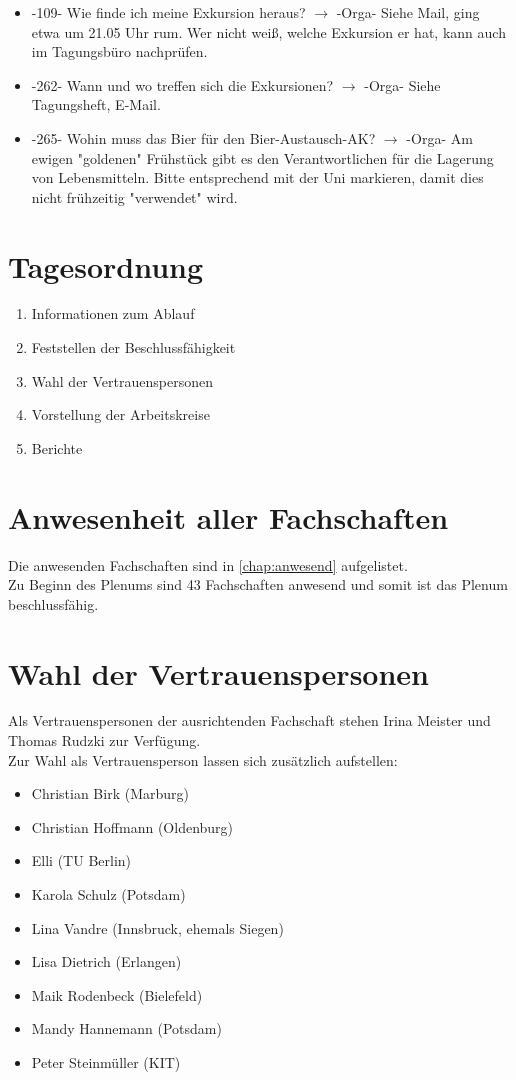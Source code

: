 \begin{itemize}
    \item -109- Wie finde ich meine Exkursion heraus? $\rightarrow$ -Orga- Siehe Mail, ging etwa um 21.05 Uhr rum. Wer nicht weiß, welche Exkursion er hat, kann auch im Tagungsbüro nachprüfen.
    \item -262- Wann und wo treffen sich die Exkursionen? $\rightarrow$ -Orga- Siehe Tagungsheft, E-Mail.
    \item -265- Wohin muss das Bier für den Bier-Austausch-AK? $\rightarrow$ -Orga- Am ewigen "goldenen" Frühstück gibt es den Verantwortlichen für die Lagerung von Lebensmitteln. Bitte entsprechend mit der Uni markieren, damit dies nicht frühzeitig "verwendet" wird.
  \end{itemize}

\section{Tagesordnung}
  \begin{enumerate}
    \item Informationen zum Ablauf
    \item Feststellen der Beschlussfähigkeit
    \item Wahl der Vertrauenspersonen
    \item Vorstellung der Arbeitskreise
    \item Berichte
  \end{enumerate}

\section{Anwesenheit aller Fachschaften}
  Die anwesenden Fachschaften sind in \autoref{chap:anwesend} aufgelistet. \\
  Zu Beginn des Plenums sind 43 Fachschaften anwesend und somit ist das Plenum beschlussfähig.

\section{Wahl der Vertrauenspersonen}

  Als Vertrauenspersonen der ausrichtenden Fachschaft stehen Irina Meister und Thomas Rudzki zur Verfügung. \\

  Zur Wahl als Vertrauensperson lassen sich zusätzlich aufstellen:
  \begin{itemize}
    \item Christian Birk (Marburg)
    \item Christian Hoffmann (Oldenburg)
    \item Elli (TU Berlin)
    \item Karola Schulz (Potsdam)
    \item Lina Vandre (Innsbruck, ehemals Siegen)
    \item Lisa Dietrich (Erlangen)
    \item Maik Rodenbeck (Bielefeld)
    \item Mandy Hannemann (Potsdam)
    \item Peter Steinmüller (KIT)
  \end{itemize}

